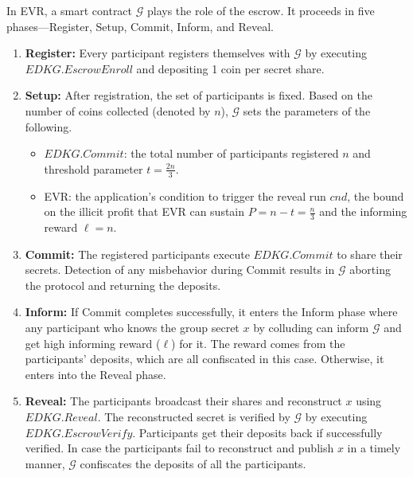 \documentclass[letterpaper,twocolumn,10pt]{article}
\theoremstyle{definition}
\theoremstyle{remark}
\begin{document}
In EVR, a smart contract $\mathcal{G}$ plays the role of the escrow. It proceeds in five phases---Register, Setup, Commit, Inform, and Reveal.
\begin{enumerate}
    \item \textbf{Register:} Every participant registers themselves with $\mathcal{G}$ by executing $EDKG.EscrowEnroll$ and depositing 1 coin per secret share.
    \item \textbf{Setup:} After registration, the set of participants is fixed. Based on the number of coins collected (denoted by $n$), $\mathcal{G}$ sets the parameters of the following.
    \begin{itemize}
        \item $EDKG.Commit$: the total number of participants registered $n$ and threshold parameter $t = \frac{2n}{3}$.
        \item EVR: the application's condition to trigger the reveal run $cnd$, the bound on the illicit profit that EVR can sustain $P= n-t = \frac{n}{3}$ and the informing reward $\ell = n$.
    \end{itemize}
    \item \textbf{Commit:} The registered participants execute $EDKG.Commit$ to share their secrets. Detection of any misbehavior during Commit results in $\mathcal{G}$ aborting the protocol and returning the deposits.
 \item \textbf{Inform:} If Commit completes successfully, it enters the Inform phase where any participant who knows the group secret $x$ by colluding can inform $\mathcal{G}$ and get high informing reward ($\ell$) for it. The reward comes from the participants’ deposits, which are all confiscated in this case. Otherwise, it enters into the Reveal phase.
    \item \textbf{Reveal:} The participants broadcast their shares and reconstruct $x$ using $EDKG.Reveal$. The reconstructed secret is verified by $\mathcal{G}$ by executing $EDKG.EscrowVerify$. Participants get their deposits back if successfully verified. In case the participants fail to reconstruct and publish $x$ in a timely manner, $\mathcal{G}$ confiscates the deposits of all the participants.
\end{enumerate}
\end{document}
